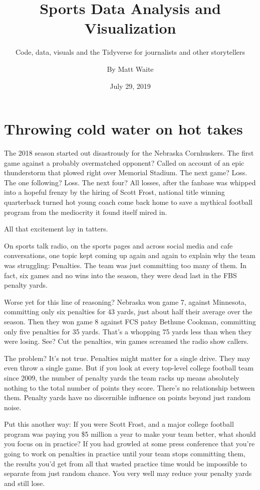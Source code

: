 \documentclass[
]{book}
\title{Sports Data Analysis and Visualization}
\subtitle{Code, data, visuals and the Tidyverse for journalists and other storytellers}
\author{By Matt Waite}
\date{July 29, 2019}
\begin{document}
\maketitle

{
\setcounter{tocdepth}{1}
\tableofcontents
}
\hypertarget{throwing-cold-water-on-hot-takes}{%
\chapter{Throwing cold water on hot takes}\label{throwing-cold-water-on-hot-takes}}

The 2018 season started out disastrously for the Nebraska Cornhuskers. The first game against a probably overmatched opponent? Called on account of an epic thunderstorm that plowed right over Memorial Stadium. The next game? Loss. The one following? Loss. The next four? All losses, after the fanbase was whipped into a hopeful frenzy by the hiring of Scott Frost, national title winning quarterback turned hot young coach come back home to save a mythical football program from the mediocrity it found itself mired in.

All that excitement lay in tatters.

On sports talk radio, on the sports pages and across social media and cafe conversations, one topic kept coming up again and again to explain why the team was struggling: Penalties. The team was just committing too many of them. In fact, six games and no wins into the season, they were dead last in the FBS penalty yards.

Worse yet for this line of reasoning? Nebraska won game 7, against Minnesota, committing only six penalties for 43 yards, just about half their average over the season. Then they won game 8 against FCS patsy Bethune Cookman, committing only five penalties for 35 yards. That's a whopping 75 yards less than when they were losing. See? Cut the penalties, win games screamed the radio show callers.

The problem? It's not true. Penalties might matter for a single drive. They may even throw a single game. But if you look at every top-level college football team since 2009, the number of penalty yards the team racks up means absolutely nothing to the total number of points they score. There's no relationship between them. Penalty yards have no discernible influence on points beyond just random noise.

Put this another way: If you were Scott Frost, and a major college football program was paying you \$5 million a year to make your team better, what should you focus on in practice? If you had growled at some press conference that you're going to work on penalties in practice until your team stops committing them, the results you'd get from all that wasted practice time would be impossible to separate from just random chance. You very well may reduce your penalty yards and still lose.
\end{document}
